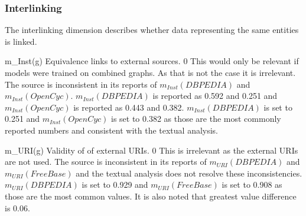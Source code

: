 \subsubsection{Interlinking}
The interlinking dimension describes whether data representing the same entities is linked.

\weighttable
{m_{Inst}(g)}
{Equivalence links to external sources.}
{0}
{This would only be relevant if models were trained on combined graphs. As that is not the case it is irrelevant.}
{The source is inconsistent in its reports of $m_{Inst}(DBPEDIA)$ and $m_{Inst}(OpenCyc)$. $m_{Inst}(DBPEDIA)$ is reported as 0.592 and 0.251 and $m_{Inst}(OpenCyc)$ is reported as 0.443 and 0.382.
$m_{Inst}(DBPEDIA)$ is set to 0.251 and $m_{Inst}(OpenCyc)$ is set to 0.382 as those are the most commonly reported numbers and consistent with the textual analysis.}

\weighttable
{m_{URI}(g)}
{Validity of of external URIs.}
{0}
{This is irrelevant as the external URIs are not used.}
{The source is inconsistent in its reports of $m_{URI}(DBPEDIA)$ and $m_{URI}(FreeBase)$ and the textual analysis does not resolve these inconsistencies. $m_{URI}(DBPEDIA)$ is set to 0.929 and $m_{URI}(FreeBase)$ is set to 0.908 as those are the most common values. It is also noted that greatest value difference is 0.06.}
\endgroup